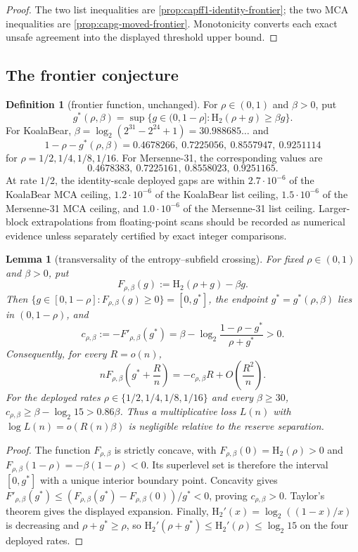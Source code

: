\documentclass[11pt]{article}
\newtheorem{lemma}[lemma]{Lemma}
\theoremstyle{definition}
\newtheorem{definition}[definition]{Definition}
\theoremstyle{remark}
\newcommand{\Hb}{\mathrm{H}_2}
\begin{document}
\begin{proof}
The two list inequalities are \cref{prop:capff1-identity-frontier}; the two MCA inequalities are \cref{prop:capg-moved-frontier}.  Monotonicity converts each exact unsafe agreement into the displayed threshold upper bound.
\end{proof}

\subsection{The frontier conjecture}

\begin{definition}[frontier function, unchanged]\label{def:capff1-gstar}
For $\rho\in(0,1)$ and $\beta>0$, put
\[
        g^*(\rho,\beta)=\sup\{g\in(0,1-\rho]:\Hb(\rho+g)\ge \beta g\}.
\]
For KoalaBear, $\beta=\log_2(2^{31}-2^{24}+1)=30.988685\ldots$ and
\[
1-\rho-g^*(\rho,\beta)=0.4678266,\ 0.7225056,\ 0.8557947,\ 0.9251114
\]
for $\rho=1/2,1/4,1/8,1/16$.  For Mersenne-31, the corresponding values are
\[
0.4678383,\ 0.7225161,\ 0.8558023,\ 0.9251165.
\]
At rate $1/2$, the identity-scale deployed gaps are within $2.7\cdot10^{-6}$ of the KoalaBear MCA ceiling, $1.2\cdot10^{-6}$ of the KoalaBear list ceiling, $1.5\cdot10^{-6}$ of the Mersenne-31 MCA ceiling, and $1.0\cdot10^{-6}$ of the Mersenne-31 list ceiling.  Larger-block extrapolations from floating-point scans should be recorded as numerical evidence unless separately certified by exact integer comparisons.
\end{definition}

\begin{lemma}[transversality of the entropy--subfield crossing]\label{lem:capff1-transversality}
For fixed $\rho\in(0,1)$ and $\beta>0$, put
\[
F_{\rho,\beta}(g):=\Hb(\rho+g)-\beta g.
\]
Then $\{g\in[0,1-\rho]:F_{\rho,\beta}(g)\ge0\}=[0,g^*]$, the endpoint $g^*=g^*(\rho,\beta)$ lies in $(0,1-\rho)$, and
\[
c_{\rho,\beta}:=-F'_{\rho,\beta}(g^*)
=\beta-\log_2\frac{1-\rho-g^*}{\rho+g^*}>0.
\]
Consequently, for every $R=o(n)$,
\[
nF_{\rho,\beta}\!\left(g^*+\frac{R}{n}\right)
=-c_{\rho,\beta}R+O\!\left(\frac{R^2}{n}\right).
\]
For the deployed rates $\rho\in\{1/2,1/4,1/8,1/16\}$ and every $\beta\ge30$,
$c_{\rho,\beta}\ge\beta-\log_2 15>0.86\beta$.  Thus a multiplicative loss $L(n)$ with
$\log L(n)=o(R(n)\beta)$ is negligible relative to the reserve separation.
\end{lemma}

\begin{proof}
The function $F_{\rho,\beta}$ is strictly concave, with
$F_{\rho,\beta}(0)=\Hb(\rho)>0$ and
$F_{\rho,\beta}(1-\rho)=-\beta(1-\rho)<0$.  Its superlevel set is therefore the interval $[0,g^*]$ with a unique interior boundary point.  Concavity gives
$F'_{\rho,\beta}(g^*)\le(F_{\rho,\beta}(g^*)-F_{\rho,\beta}(0))/g^*<0$, proving $c_{\rho,\beta}>0$.  Taylor's theorem gives the displayed expansion.  Finally,
$\Hb'(x)=\log_2((1-x)/x)$ is decreasing and $\rho+g^*\ge\rho$, so
$\Hb'(\rho+g^*)\le\Hb'(\rho)\le\log_2 15$ on the four deployed rates.
\end{proof}
\end{document}
